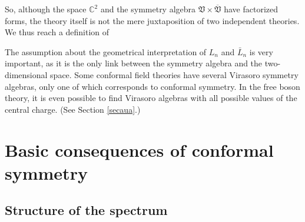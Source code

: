 \documentclass[12pt,a4paper,notitlepage]{report}
\numberwithin{equation}{section}
\theoremstyle{break}
\begin{document}
So, although the space ${\mathbb{C}}^2$ and the symmetry algebra $\mathfrak{V}\times \overline{\mathfrak{V}}$  have factorized forms, the theory itself is not the mere juxtaposition of two independent theories. 
We thus reach a definition of 
\begin{center}
\end{center}
The assumption about the geometrical interpretation of $L_n$ and $\bar{L}_n$ is very important, as it is the only link between the symmetry algebra and the two-dimensional space.
Some conformal field theories have several Virasoro symmetry algebras, only one of which corresponds to conformal symmetry.
In the free boson theory, it is even possible to find Virasoro algebras with all possible values of the central charge. (See Section \ref{secaua}.)


\section{Basic consequences of conformal symmetry}

\subsection{Structure of the spectrum \label{secsots}}
\end{document}
